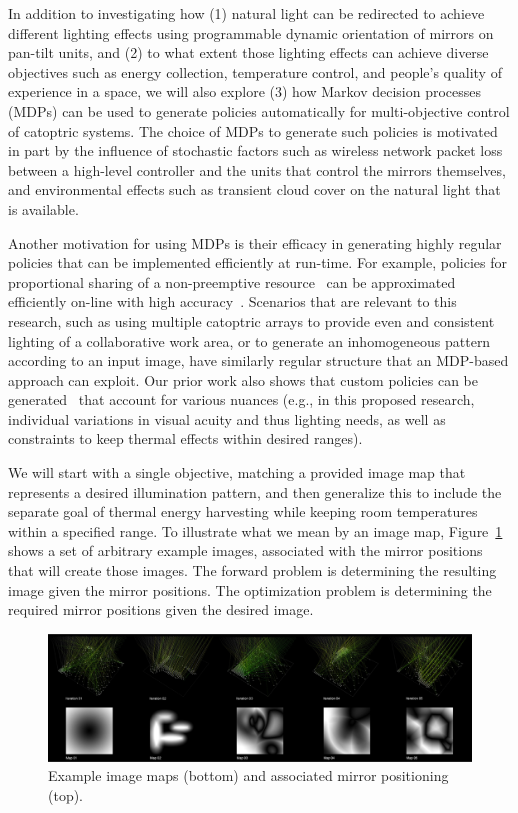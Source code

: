 In addition to investigating how (1) natural light can be redirected to achieve
different lighting effects using programmable dynamic orientation of mirrors on 
pan-tilt units, and (2) to what extent those lighting effects can achieve diverse
objectives such as energy collection, temperature control, and people's quality 
of experience in a space, we will also explore (3) how Markov decision processes 
(MDPs) can be used to generate policies automatically for multi-objective control of 
catoptric systems.  The choice of MDPs to generate such policies is motivated in part 
by the influence of stochastic factors such as wireless network packet loss between
a high-level controller and the units that control the mirrors themselves, and 
environmental effects such as transient cloud cover on the natural light that is 
available.

Another motivation for using MDPs is their efficacy in generating highly regular 
policies that can be implemented efficiently at run-time.  For example, policies for
proportional sharing of a non-preemptive resource~\cite{gtgs09,gtsg08} can be 
approximated efficiently on-line with high accuracy~\cite{gtspmgs10}.  Scenarios
that are relevant to this research, such as using multiple catoptric arrays to
provide even and consistent lighting of a collaborative work area, or to generate
an inhomogeneous pattern according to an input image, have similarly
regular structure that an MDP-based approach can exploit.  Our prior work also
shows that custom policies can be generated~\cite{tblwgs11,tggs10} that account 
for various nuances (e.g., in this proposed research, individual variations in 
visual acuity and thus lighting needs, as well as constraints to keep thermal 
effects within desired ranges).

We will start with a single objective, matching a provided image map that represents a 
desired illumination pattern, and then generalize this to include the separate goal of 
thermal energy harvesting while keeping room temperatures within a specified range.
To illustrate what we mean by an image map, Figure~\ref{fig:maps}
shows a set of arbitrary example images, associated with the mirror
positions that will create those images.  The forward problem is determining
the resulting image given the mirror positions.  The optimization problem
is determining the required mirror positions given the desired image.

\begin{figure}[ht]
\centering
\includegraphics[width=0.9\linewidth]{figures/maps}
\caption{Example image maps (bottom) and associated mirror positioning (top).}
\label{fig:maps}
\end{figure}

